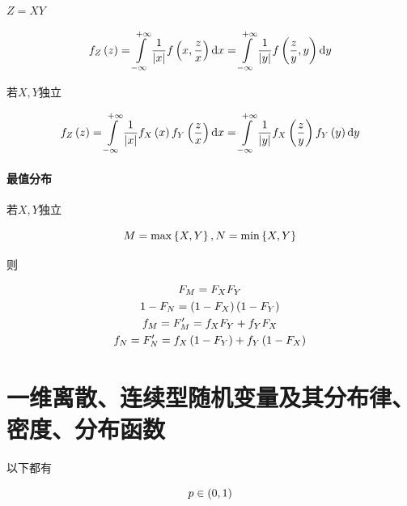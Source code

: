 \documentclass{article}
\begin{document}
$Z=XY$

\[f_Z\left(z\right)
    =\int\limits_{-\infty}^{+\infty}\frac1{\left|x\right|}f\left(x,\frac zx\right)\mathrm d x
    =\int\limits_{-\infty}^{+\infty}\frac1{\left|y\right|}f\left(\frac zy,y\right)\mathrm d y\]

若$X,Y$独立

\[f_Z\left(z\right)
    =\int\limits_{-\infty}^{+\infty}\frac1{\left|x\right|}f_X\left(x\right)f_Y\left(\frac zx\right)\mathrm d x
    =\int\limits_{-\infty}^{+\infty}\frac1{\left|y\right|}f_X\left(\frac zy\right)f_Y\left(y\right)\mathrm d y\]

\paragraph{最值分布}

若$X,Y$独立

\[M=\max\left\{X,Y\right\},N=\min\left\{X,Y\right\}\]

则

\[\begin{gathered}
        F_M=F_XF_Y\\
        1-F_N=\left(1-F_X\right)\left(1-F_Y\right)\\
        f_M=F^\prime_M=f_XF_Y+f_YF_X\\
        f_N=F^\prime_N=f_X\left(1-F_Y\right)+f_Y\left(1-F_X\right)
    \end{gathered}\]


\section{一维离散、连续型随机变量及其分布律、密度、分布函数}

以下都有

\[p\in\left(0,1\right)\]
\end{document}
